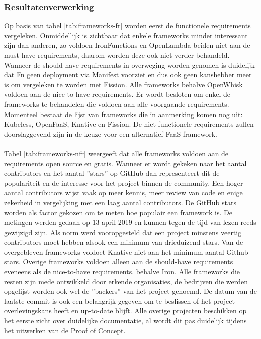 \subsubsection{Resultatenverwerking}
Op basis van tabel \ref{tab:frameworks-fr} worden eerst de functionele requirements vergeleken. Onmiddellijk is zichtbaar dat enkele frameworks minder interessant zijn dan anderen, zo voldoen IronFunctions en OpenLambda beiden niet aan de must-have requirements, daarom worden deze ook niet verder behandeld. Wanneer de should-have requirements in overweging worden genomen is duidelijk dat Fn geen deployment via Manifest voorziet en dus ook geen kanshebber meer is om vergeleken te worden met Fission. Alle frameworks behalve OpenWhisk voldoen aan de nice-to-have requirements. Er wordt besloten om enkel de frameworks te behandelen die voldoen aan alle voorgaande requirements. Momenteel bestaat de lijst van frameworks die in aanmerking komen nog uit: Kubeless, OpenFaaS, Knative en Fission. De niet-functionele requirements zullen doorslaggevend zijn in de keuze voor een alternatief FaaS framework.
\\\\
Tabel \ref{tab:frameworks-nfr} weergeeft dat alle frameworks voldoen aan de requirements open source en gratis. Wanneer er wordt gekeken naar het aantal contributors en het aantal ''stars'' op GitHub dan representeert dit de populariteit en de interesse voor het project binnen de community. Een hoger aantal contributors wijst vaak op meer kennis, meer review van code en enige zekerheid in vergelijking met een laag aantal contributors. De GitHub stars worden als factor gekozen om te meten hoe populair een framework is. De metingen werden gedaan op 13 april 2019 en kunnen tegen de tijd van lezen reeds gewijzigd zijn. Als norm werd vooropgesteld dat een project minstens veertig contributors moet hebben alsook een minimum van drieduizend stars. Van de overgebleven frameworks voldoet Knative niet aan het minimum aantal Github stars. Overige frameworks voldoen alleen aan de should-have requirements eveneens als de nice-to-have requirements. behalve Iron. Alle frameworks die resten zijn mede ontwikkeld door erkende organisaties, de bedrijven die werden opgelijst worden ook wel de ''backers'' van het project genoemd. De datum van de laatste commit is ook een belangrijk gegeven om te beslissen of het project overlevingskans heeft en up-to-date blijft. Alle overige projecten beschikken op het eerste zicht over duidelijke documentatie, al wordt dit pas duidelijk tijdens het uitwerken van de Proof of Concept. 

